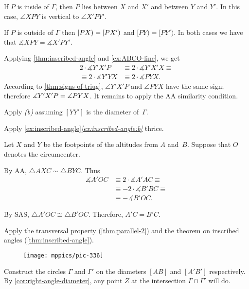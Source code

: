  If $P$ is inside of $\Gamma$, then $P$ lies between $X$ and $X'$ and between $Y$ and $Y'$.
In this case, $\angle XPY$ is vertical to $\angle X'PY'$.

If $P$ is outside of $\Gamma$ then $[PX)=[PX')$ and $[PY)=[PY')$.
In both cases we have that $\measuredangle XPY=\measuredangle X'PY'$.

Applying \ref{thm:inscribed-angle} and \ref{ex:ABCO-line}, we get
\pagebreak[0]
\begin{align*}
2\cdot \measuredangle Y'X'P
&\equiv
2\cdot \measuredangle Y'X'X\equiv 
\\
\equiv
2\cdot\measuredangle Y'YX
&\equiv
2\cdot\measuredangle PYX.
\end{align*}
According to \ref{thm:signs-of-triug}, $\angle Y'X'P$ and $\angle PYX$ have the same sign;
therefore
$\measuredangle Y'X'P= \measuredangle PYX$.
It remains to apply the AA similarity condition.

 Apply \textit{(b)} assuming $[YY']$ is the diameter of~$\Gamma$. 

 Apply \ref{ex:inscribed-angle}\textit{\ref{ex:inscribed-angle:b}}
thrice.

Let $X$ and $Y$ be the footpoints of the altitudes from $A$ and~$B$.
Suppose that $O$ denotes the circumcenter.
 
By AA, $\triangle A X C\sim \triangle B Y C$.
Thus 
\begin{align*}
\measuredangle A'OC
&\equiv 
2\cdot \measuredangle A' A C
\equiv
\\
&\equiv-2\cdot\measuredangle B' B C
\equiv
\\
&\equiv-\measuredangle B'OC.
\end{align*}

By SAS, $\triangle A'OC\cong\triangle B'OC$.
Therefore, $A'C=B'C$.

 Apply the transversal property (\ref{thm:parallel-2}) and the theorem on inscribed angles (\ref{thm:inscribed-angle}).

\begin{wrapfigure}[9]{r}{20mm}
\vskip-2mm
\centering
\texttt{[image: mppics/pic-336]}
\end{wrapfigure}

Construct the circles $\Gamma$ and $\Gamma'$
on the diameters $[AB]$ and $[A'B']$ respectively.
By \ref{cor:right-angle-diameter},
any point $Z$ at the intersection $\Gamma\cap \Gamma'$ will do.

